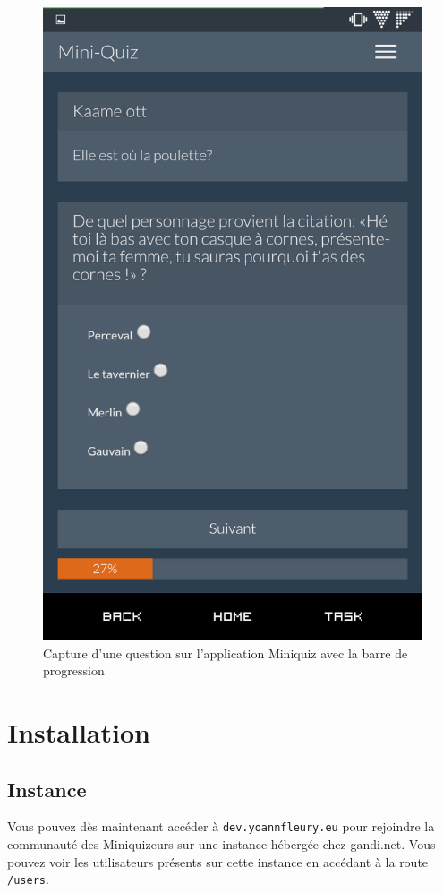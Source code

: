 \documentclass[12pt]{article}
\begin{document}
        \begin{figure}[!ht]
            \caption{\label{fig:miniquiz-progress-rwd} Capture d'une question sur l'application Miniquiz avec la barre de progression}
            \includegraphics[scale=0.2]{res/miniquiz-progress-rwd.png}
        \end{figure}
    

\section{Installation}
    \subsection{Instance} Vous pouvez dès maintenant accéder à \texttt{dev.yoannfleury.eu} pour rejoindre la communauté des Miniquizeurs sur une instance hébergée chez gandi.net. Vous pouvez voir les utilisateurs présents sur cette instance en accédant à la route \texttt{/users}.
\end{document}
